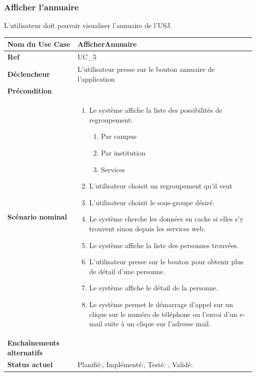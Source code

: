 			\subsubsection{Afficher l'annuaire}
					L'utilisateur doit pouvoir visualiser l'annuaire de l'USJ.\\[0.2cm]
					\begin{longtable}{|l|p{10cm}|}
						\hline \textbf{Nom du Use Case} & AfficherAnnuaire \\ 
						\hline \textbf{Ref} & UC\_5  \\ 
						\hline \textbf{Déclencheur} & L'utilisateur presse sur le bouton annuaire  de l'application \\
						\hline \textbf{Précondition} &  \\
						\hline \textbf{Scénario nominal} & 
						\begin{enumerate}
							\item Le système affiche la liste des possibilités de regroupement:
								\begin{enumerate}
									\item Par campus
									\item Par institution
									\item Services
								\end{enumerate}
							\item L'utilisateur choisit un regroupement qu'il veut
							\item L'utilisateur choisit le sous-groupe désiré.
							\item Le système cherche les données en cache si elles s'y trouvent sinon depuis les services web.
							\item Le système affiche la liste des personnes trouvées.
							\item L'utilisateur presse sur le bouton pour obtenir plus de détail d'une personne.
							\item Le système affiche le détail de la personne.
							\item Le système permet le démarrage d'appel sur un clique sur le numéro de téléphone ou l'envoi d'un e-mail suite à un clique sur l'adresse mail.
						\end{enumerate}
						\\ 
						\hline \textbf{Enchaînements alternatifs} & \\
						\hline \textbf{Status actuel} & Planifié:\CheckedBox , Implémenté:\CheckedBox  , Testé: \CheckedBox  , Validé: \CheckedBox  \\
						\hline 
					\end{longtable} 
